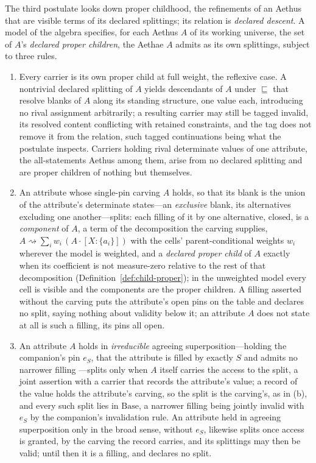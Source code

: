 \begin{defin}\label{def:descent}
The third postulate looks down proper childhood, the refinements of an Aethus that are visible terms of its declared splittings; its relation is \emph{declared descent}. A model of the algebra specifies, for each Aethus $A$ of its working universe, the set of $A$'s \emph{declared proper children}, the Aethae $A$ admits as its own splittings, subject to three rules.
\begin{enumerate}
\item[(a)] Every carrier is its own proper child at full weight, the reflexive case. A nontrivial declared splitting of $A$ yields descendants of $A$ under $\sqsubseteq$ that resolve blanks of $A$ along its standing structure, one value each, introducing no rival assignment arbitrarily; a resulting carrier may still be tagged invalid, its resolved content conflicting with retained constraints, and the tag does not remove it from the relation, such tagged continuations being what the postulate inspects. Carriers holding rival determinate values of one attribute, the all-statements Aethus among them, arise from no declared splitting and are proper children of nothing but themselves.
\item[(b)] An attribute whose single-pin carving $A$ holds, so that its blank is the union of the attribute's determinate states---an \emph{exclusive} blank, its alternatives excluding one another---splits: each filling of it by one alternative, closed, is a \emph{component} of $A$, a term of the decomposition the carving supplies, $A \rightsquigarrow \sum_i w_i\,(A \cdot [X : \{a_i\}])$ with the cells' parent-conditional weights $w_i$ wherever the model is weighted, and a \emph{declared proper child} of $A$ exactly when its coefficient is not measure-zero relative to the rest of that decomposition (Definition~\ref{def:child-proper}); in the unweighted model every cell is visible and the components are the proper children. A filling asserted without the carving puts the attribute's open pins on the table and declares no split, saying nothing about validity below it; an attribute $A$ does not state at all is such a filling, its pins all open.
\item[(c)] An attribute $A$ holds in \emph{irreducible} agreeing superposition---holding the companion's pin $e_S$, that the attribute is filled by exactly $S$ and admits no narrower filling \cite{Aethus}---splits only when $A$ itself carries the access to the split, a joint assertion with a carrier that records the attribute's value; a record of the value holds the attribute's carving, so the split is the carving's, as in (b), and every such split lies in $\mathrm{Base}$, a narrower filling being jointly invalid with $e_S$ by the companion's invalidation rule. An attribute held in agreeing superposition only in the broad sense, without $e_S$, likewise splits once access is granted, by the carving the record carries, and its splittings may then be valid; until then it is a filling, and declares no split.

\end{enumerate}
\end{defin}
